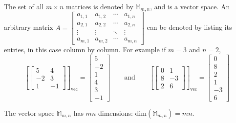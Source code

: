 \documentclass{article}
\begin{document}
The set of all \(m \times n\) matrices is denoted by \(\mathbb{M}_{m,n}\), and is a vector space. An arbitrary matrix \(A = \begin{bmatrix} a_{1,1} & a_{1,2} & \cdots & a_{1,n} \\ a_{2,1} & a_{2,2} & \cdots & a_{2,n} \\ \vdots & \vdots & \ddots & \vdots \\ a_{m,1} & a_{m,2} & \cdots & a_{m,n} \end{bmatrix}\) can be denoted by listing its entries, in this case column by column. For example if \(m = 3\) and \(n = 2\),
\[\left[\begin{bmatrix} 5 & 4 \\ -2 & 3 \\ 1 & -1 \end{bmatrix}\right]_{\text{vec}} = \begin{bmatrix} 5 \\ -2 \\ 1 \\ 4 \\ 3 \\ -1 \end{bmatrix} \quad\quad\text{and}\quad\quad 
\left[\begin{bmatrix} 0 & 1 \\ 8 & -3 \\ 2 & 6 \end{bmatrix}\right]_{\text{vec}} = \begin{bmatrix} 0 \\ 8 \\ 2 \\ 1 \\ -3 \\ 6 \end{bmatrix}\]   

The vector space \(\mathbb{M}_{m,n}\) has \(m n\) dimensions: \(\text{dim}(\mathbb{M}_{m,n}) = m n\).
\end{document}
